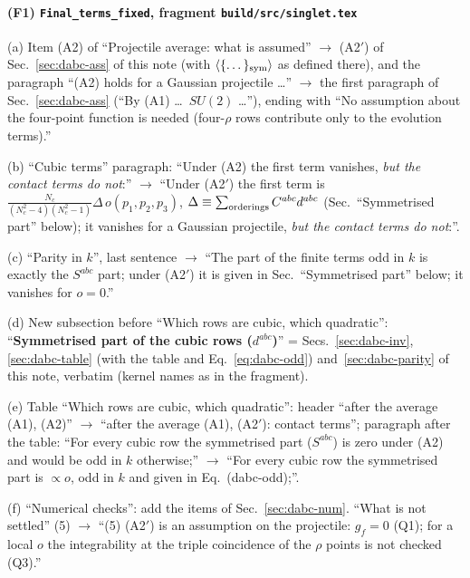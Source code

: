 \documentclass[10pt]{article}
\begin{document}
\paragraph*{(F1) \texttt{Final\_terms\_fixed}, fragment \texttt{build/src/singlet.tex}}
\noindent (a) Item (A2) of ``Projectile average: what is assumed'' $\to$ (A2$'$) of Sec.~\ref{sec:dabc-ass} of this note (with $\langle\{\dots\}_{\rm sym}\rangle$ as defined there), and the paragraph ``(A2) holds for a Gaussian projectile \dots'' $\to$ the first paragraph of Sec.~\ref{sec:dabc-ass} (``By (A1) \dots\ $SU(2)$ \dots''), ending with ``No assumption about the four-point function is needed (four-$\rho$ rows contribute only to the evolution terms).''\par
\noindent (b) ``Cubic terms'' paragraph: ``Under (A2) the first term vanishes, \emph{but the contact terms do not}:'' $\to$ ``Under (A2$'$) the first term is $\frac{N_{c}}{(N_{c}^{2}-4)(N_{c}^{2}-1)}\Delta\,o(p_{1},p_{2},p_{3})$, $\Delta\equiv\sum_{\rm orderings}C^{abc}d^{abc}$ (Sec.~``Symmetrised part'' below); it vanishes for a Gaussian projectile, \emph{but the contact terms do not}:''.\par
\noindent (c) ``Parity in $k$'', last sentence $\to$ ``The part of the finite terms odd in $k$ is exactly the $S^{abc}$ part; under (A2$'$) it is given in Sec.~``Symmetrised part'' below; it vanishes for $o=0$.''\par
\noindent (d) New subsection before ``Which rows are cubic, which quadratic'': ``\textbf{Symmetrised part of the cubic rows ($d^{abc}$)}'' = Secs.~\ref{sec:dabc-inv}, \ref{sec:dabc-table} (with the table and Eq.~\eqref{eq:dabc-odd}) and~\ref{sec:dabc-parity} of this note, verbatim (kernel names as in the fragment).\par
\noindent (e) Table ``Which rows are cubic, which quadratic'': header ``after the average (A1), (A2)'' $\to$ ``after the average (A1), (A2$'$): contact terms''; paragraph after the table: ``For every cubic row the symmetrised part ($S^{abc}$) is zero under (A2) and would be odd in $k$ otherwise;'' $\to$ ``For every cubic row the symmetrised part is $\propto o$, odd in $k$ and given in Eq.~(dabc-odd);''.\par
\noindent (f) ``Numerical checks'': add the items of Sec.~\ref{sec:dabc-num}. ``What is not settled'' (5) $\to$ ``(5) (A2$'$) is an assumption on the projectile: $g_{f}=0$ (Q1); for a local $o$ the integrability at the triple coincidence of the $\rho$ points is not checked (Q3).''
\endgroup

\clearpage
\appendix
\end{document}
